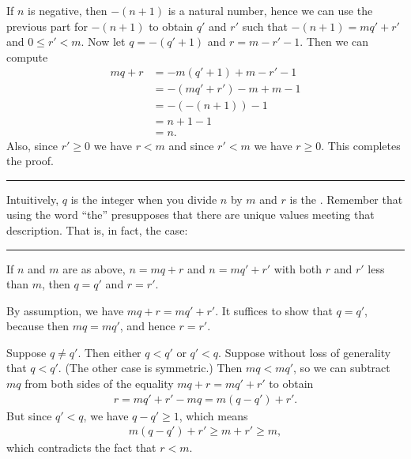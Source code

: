 \documentclass[letterpaper,10pt,english]{sphinxmanual}
\begin{document}
\sphinxAtStartPar
If \(n\) is negative, then \(-(n+1)\) is a natural number, hence we can use the previous part for \(-(n+1)\) to obtain \(q'\) and \(r'\) such that \(-(n+1) = m q' + r'\) and \(0 \le r' < m\). Now let \(q = -(q' + 1)\) and \(r = m - r' - 1\). Then we can compute
\begin{equation*}
\begin{split}m q + r &= -m (q' + 1) + m - r' - 1\\
&=  -(m q' + r') - m + m - 1\\
&= -(-(n+1)) - 1\\
&= n + 1 - 1\\
&= n.\end{split}
\end{equation*}
\sphinxAtStartPar
Also, since \(r' \geq 0\) we have \(r < m\) and since \(r' < m\) we have \(r \geq 0\). This completes the proof.


\bigskip\hrule\bigskip


\sphinxAtStartPar
Intuitively, \(q\) is the integer  when you divide \(n\) by \(m\) and \(r\) is the . Remember that using the word “the” presupposes that there are unique values meeting that description. That is, in fact, the case:


\bigskip\hrule\bigskip


\sphinxAtStartPar
{} If \(n\) and \(m\) are as above, \(n = m q + r\) and \(n = m q' + r'\) with both \(r\) and \(r'\) less than \(m\), then \(q = q'\) and \(r = r'\).

\sphinxAtStartPar
{} By assumption, we have \(mq + r = m q' + r'\). It suffices to show that \(q = q'\), because then \(m q = m q'\), and hence \(r = r'\).

\sphinxAtStartPar
Suppose \(q \ne q'\). Then either \(q < q'\) or \(q' < q\). Suppose without loss of generality that \(q < q'\). (The other case is symmetric.) Then \(m q < m q'\), so we can subtract \(mq\) from both sides of the equality \(mq + r = m q' + r'\) to obtain
\begin{equation*}
\begin{split}r = m q' + r' - m q = m (q - q') + r'.\end{split}
\end{equation*}
\sphinxAtStartPar
But since \(q' < q\), we have \(q - q' \ge 1\), which means
\begin{equation*}
\begin{split}m (q - q') + r' \ge m + r' \ge m,\end{split}
\end{equation*}
\sphinxAtStartPar
which contradicts the fact that \(r < m\).
\end{document}
